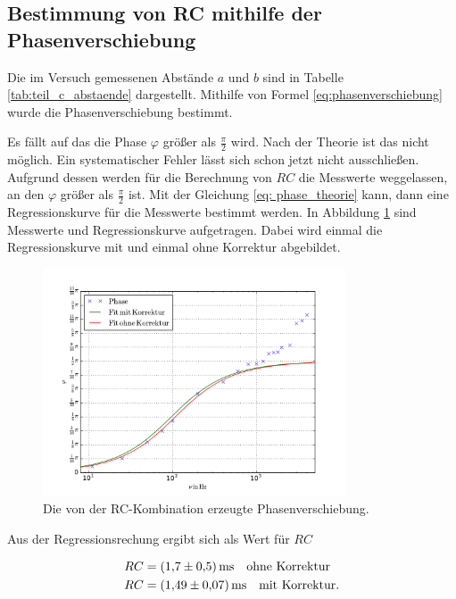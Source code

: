 \subsection{Bestimmung von RC mithilfe der Phasenverschiebung}
Die im Versuch gemessenen Abstände $a$ und $b$ sind in Tabelle \ref{tab:teil_c_abstaende}
dargestellt. Mithilfe von Formel \eqref{eq:phasenverschiebung} wurde die
Phasenverschiebung bestimmt.



Es fällt auf das die Phase $\varphi$ größer als $\frac{\pi}{2}$ wird.
Nach der Theorie ist das nicht möglich.
Ein systematischer Fehler lässt sich schon jetzt nicht ausschließen.
Aufgrund dessen werden für die Berechnung von $RC$ die Messwerte weggelassen, an den
$\varphi$ größer als $\frac{\pi}{2}$ ist.
Mit der Gleichung \eqref{eq: phase_theorie} kann, dann eine Regressionskurve für die
Messwerte bestimmt werden.
In Abbildung \ref{fig:plot_teil_c} sind Messwerte und Regressionskurve aufgetragen.
Dabei wird einmal die Regressionskurve mit und einmal ohne Korrektur abgebildet.

\FloatBarrier
\begin{figure}
  \centering
  \includegraphics[width=0.8\textwidth]{pics/frequenz_phase.pdf}
  \caption{Die von der RC-Kombination erzeugte Phasenverschiebung.}
  \label{fig:plot_teil_c}
\end{figure}
\FloatBarrier

Aus der Regressionsrechung ergibt sich als Wert für $RC$

\begin{align}
  \label{eq:teil_c_rc}
  \begin{aligned}
    RC&=\SI{1.7\pm0.5}{\milli\second} \quad \text{ohne Korrektur} \\
    RC& =\SI{1.49\pm0.07}{\milli\second} \quad \text{mit Korrektur}.
\end{aligned}
\end{align}

